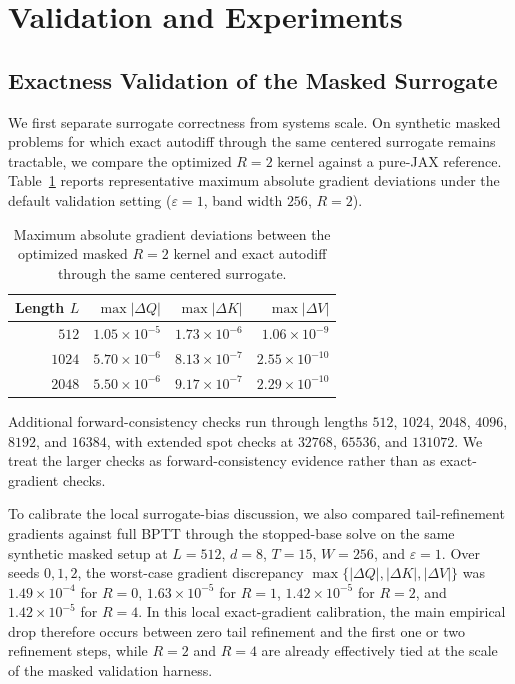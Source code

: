\documentclass{article}
\begin{document}
\section{Validation and Experiments}

\subsection{Exactness Validation of the Masked Surrogate}

We first separate surrogate correctness from systems scale. On synthetic masked problems for which exact autodiff through the same centered surrogate remains tractable, we compare the optimized $R=2$ kernel against a pure-JAX reference. Table~\ref{tab:exactness_unified} reports representative maximum absolute gradient deviations under the default validation setting ($\varepsilon=1$, band width $256$, $R=2$).

\begin{table}[h]
    \centering
    \begin{tabular}{@{}rrrr@{}}
        \toprule
        Length $L$ & $\max |\Delta Q|$ & $\max |\Delta K|$ & $\max |\Delta V|$ \\
        \midrule
        $512$ & $1.05 \times 10^{-5}$ & $1.73 \times 10^{-6}$ & $1.06 \times 10^{-9}$ \\
        $1024$ & $5.70 \times 10^{-6}$ & $8.13 \times 10^{-7}$ & $2.55 \times 10^{-10}$ \\
        $2048$ & $5.50 \times 10^{-6}$ & $9.17 \times 10^{-7}$ & $2.29 \times 10^{-10}$ \\
        \bottomrule
    \end{tabular}
    \caption{Maximum absolute gradient deviations between the optimized masked $R=2$ kernel and exact autodiff through the same centered surrogate.}
    \label{tab:exactness_unified}
\end{table}

Additional forward-consistency checks run through lengths $512$, $1024$, $2048$, $4096$, $8192$, and $16384$, with extended spot checks at $32768$, $65536$, and $131072$. We treat the larger checks as forward-consistency evidence rather than as exact-gradient checks.

To calibrate the local surrogate-bias discussion, we also compared tail-refinement gradients against full BPTT through the stopped-base solve on the same synthetic masked setup at $L=512$, $d=8$, $T=15$, $W=256$, and $\varepsilon=1$. Over seeds $0,1,2$, the worst-case gradient discrepancy $\max\{|\Delta Q|,|\Delta K|,|\Delta V|\}$ was $1.49\times 10^{-4}$ for $R=0$, $1.63\times 10^{-5}$ for $R=1$, $1.42\times 10^{-5}$ for $R=2$, and $1.42\times 10^{-5}$ for $R=4$. In this local exact-gradient calibration, the main empirical drop therefore occurs between zero tail refinement and the first one or two refinement steps, while $R=2$ and $R=4$ are already effectively tied at the scale of the masked validation harness.
\end{document}
